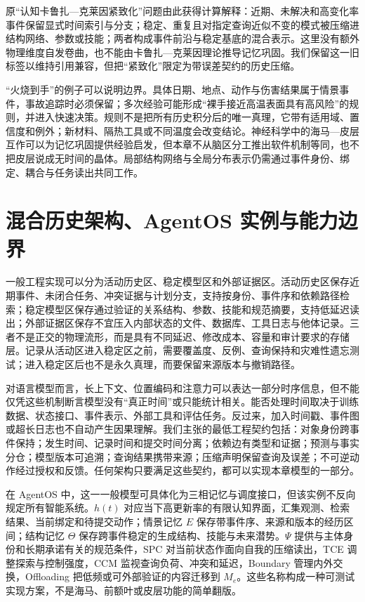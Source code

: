 \label{sec:cognitive_kaluza_klein_compactification}
原“认知卡鲁扎—克莱因紧致化”问题由此获得计算解释：近期、未解决和高变化率事件保留显式时间索引与分支；稳定、重复且对指定查询近似不变的模式被压缩进结构网络、参数或技能；两者构成事件前沿与稳定基底的混合表示。这里没有额外物理维度自发卷曲，也不能由卡鲁扎—克莱因理论推导记忆巩固。我们保留这一旧标签以维持引用兼容，但把“紧致化”限定为带误差契约的历史压缩。

“火烧到手”的例子可以说明边界。具体日期、地点、动作与伤害结果属于情景事件，事故追踪时必须保留；多次经验可能形成“裸手接近高温表面具有高风险”的规则，并进入快速决策。规则不是把所有历史积分后的唯一真理，它带有适用域、置信度和例外；新材料、隔热工具或不同温度会改变结论。神经科学中的海马—皮层互作可以为记忆巩固提供经验启发，但本章不从脑区分工推出软件机制等同，也不把皮层说成无时间的晶体。局部结构网络与全局分布表示仍需通过事件身份、绑定、耦合与任务读出共同工作。

\section{混合历史架构、AgentOS 实例与能力边界}

一般工程实现可以分为活动历史区、稳定模型区和外部证据区。活动历史区保存近期事件、未闭合任务、冲突证据与计划分支，支持按身份、事件序和依赖路径检索；稳定模型区保存通过验证的关系结构、参数、技能和规范摘要，支持低延迟读出；外部证据区保存不宜压入内部状态的文件、数据库、工具日志与他体记录。三者不是正交的物理流形，而是具有不同延迟、修改成本、容量和审计要求的存储层。记录从活动区进入稳定区之前，需要覆盖度、反例、查询保持和灾难性遗忘测试；进入稳定区后也不是永久真理，而要保留来源版本与撤销路径。

对语言模型而言，长上下文、位置编码和注意力可以表达一部分时序信息，但不能仅凭这些机制断言模型没有“真正时间”或只能统计相关。能否处理时间取决于训练数据、状态接口、事件表示、外部工具和评估任务。反过来，加入时间戳、事件图或超长日志也不自动产生因果理解。我们主张的最低工程契约包括：对象身份跨事件保持；发生时间、记录时间和提交时间分离；依赖边有类型和证据；预测与事实分仓；模型版本可追溯；查询结果携带来源；压缩声明保留查询及误差；不可逆动作经过授权和反馈。任何架构只要满足这些契约，都可以实现本章模型的一部分。

在 AgentOS 中，这一一般模型可具体化为三相记忆与调度接口，但该实例不反向规定所有智能系统。$h(t)$ 对应当下高更新率的有限认知界面，汇集观测、检索结果、当前绑定和待提交动作；情景记忆 $E$ 保存带事件序、来源和版本的经历区间；结构记忆 $\Theta$ 保存跨事件稳定的生成结构、技能与未来潜势。$\Psi$ 提供与主体身份和长期承诺有关的规范条件，SPC 对当前状态作面向自我的压缩读出，TCE 调整探索与控制强度，CCM 监视查询负荷、冲突和延迟，Boundary 管理内外交换，Offloading 把低频或可外部验证的内容迁移到 $M_e$。这些名称构成一种可测试实现方案，不是海马、前额叶或皮层功能的简单翻版。

